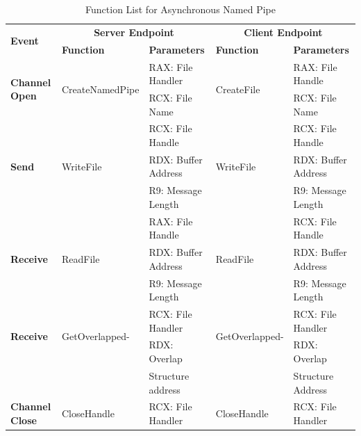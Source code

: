     \begin{table}[H]
        \centering
        \caption{Function List for Asynchronous Named Pipe}
        \label{asynfunctions}
        \begin{tabular}{|l|l|l|l|l|}
            \hline
             \multirow{2}{*}{\textbf{Event}} &
               \multicolumn{2}{c|}{\textbf{Server Endpoint}} &
               \multicolumn{2}{c|}{\textbf{Client Endpoint}} \\
             \cline{2-5}
              & \textbf{Function}& \textbf{Parameters} & \textbf{Function} & \textbf{Parameters}  \\
             \hline
             \multirow{2}{*}{{\textbf{Channel Open}}}
             &\multirow{2}{*}{{CreateNamedPipe}} &  RAX: File Handler & \multirow{2}{*}{CreateFile} &  RAX: File Handle\\
              \cline{3-3} \cline{5-5}
             &&  RCX: File Name &  &  RCX: File Name\\
            \hline
             \multirow{3}{*}{{\textbf{Send}}}
             &\multirow{3}{*}{WriteFile} &  RCX: File Handle & \multirow{3}{*}{WriteFile} &  RCX: File Handle\\
              \cline{3-3} \cline{5-5}
             &&  RDX: Buffer Address &  &  RDX: Buffer Address\\
                           \cline{3-3} \cline{5-5}
             & &  R9: Message Length &  &  R9: Message Length\\
            \hline
            \multirow{3}{*}{{\textbf{Receive}}}
             & \multirow{3}{*}{ReadFile}&  RAX: File Handle & \multirow{3}{*}{ReadFile} &  RCX: File Handle\\
              \cline{3-3} \cline{5-5}
              &&  RDX: Buffer Address &  &  RDX: Buffer Address\\
                           \cline{3-3} \cline{5-5}
             & &  R9: Message Length &  &  R9: Message Length\\
              \hline
               \multirow{2}{*}{{\textbf{Receive}}}
             & \multirow{2}{*}{GetOverlapped-}&  RCX: File Handler & \multirow{2}{*}{GetOverlapped-} &  RCX: File Handler\\
              \cline{3-3} \cline{5-5}
             &  \multirow{2}{*}{Result} &  RDX:  Overlap  &  \multirow{2}{*}{Result }&  RDX:  Overlap \\
              &  &  Structure address &  &  Structure Address\\
            \hline                       
            \textbf{Channel Close}
             &{CloseHandle} &{RCX: File Handler} & {CloseHandle} &  {RCX: File Handler}\\
            \hline
        \end{tabular}
    \end{table}
    
